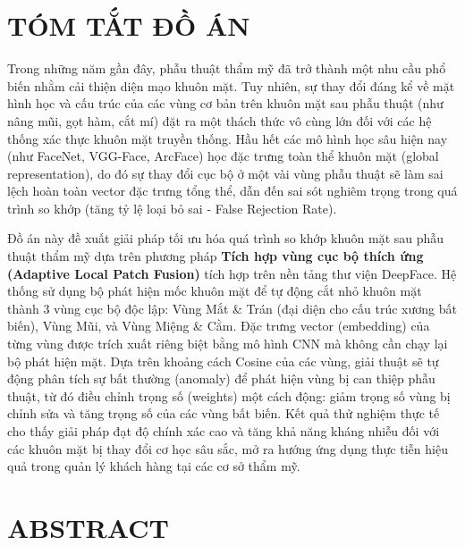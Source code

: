 \section*{TÓM TẮT ĐỒ ÁN}

Trong những năm gần đây, phẫu thuật thẩm mỹ đã trở thành một nhu cầu phổ biến nhằm cải thiện diện mạo khuôn mặt. Tuy nhiên, sự thay đổi đáng kể về mặt hình học và cấu trúc của các vùng cơ bản trên khuôn mặt sau phẫu thuật (như nâng mũi, gọt hàm, cắt mí) đặt ra một thách thức vô cùng lớn đối với các hệ thống xác thực khuôn mặt truyền thống. Hầu hết các mô hình học sâu hiện nay (như FaceNet, VGG-Face, ArcFace) học đặc trưng toàn thể khuôn mặt (global representation), do đó sự thay đổi cục bộ ở một vài vùng phẫu thuật sẽ làm sai lệch hoàn toàn vector đặc trưng tổng thể, dẫn đến sai sót nghiêm trọng trong quá trình so khớp (tăng tỷ lệ loại bỏ sai - False Rejection Rate).

Đồ án này đề xuất giải pháp tối ưu hóa quá trình so khớp khuôn mặt sau phẫu thuật thẩm mỹ dựa trên phương pháp \textbf{Tích hợp vùng cục bộ thích ứng (Adaptive Local Patch Fusion)} tích hợp trên nền tảng thư viện DeepFace. Hệ thống sử dụng bộ phát hiện mốc khuôn mặt để tự động cắt nhỏ khuôn mặt thành 3 vùng cục bộ độc lập: Vùng Mắt \& Trán (đại diện cho cấu trúc xương bất biến), Vùng Mũi, và Vùng Miệng \& Cằm. Đặc trưng vector (embedding) của từng vùng được trích xuất riêng biệt bằng mô hình CNN mà không cần chạy lại bộ phát hiện mặt. Dựa trên khoảng cách Cosine của các vùng, giải thuật sẽ tự động phân tích sự bất thường (anomaly) để phát hiện vùng bị can thiệp phẫu thuật, từ đó điều chỉnh trọng số (weights) một cách động: giảm trọng số vùng bị chỉnh sửa và tăng trọng số của các vùng bất biến. Kết quả thử nghiệm thực tế cho thấy giải pháp đạt độ chính xác cao và tăng khả năng kháng nhiễu đối với các khuôn mặt bị thay đổi cơ học sâu sắc, mở ra hướng ứng dụng thực tiễn hiệu quả trong quản lý khách hàng tại các cơ sở thẩm mỹ.

\newpage
\section*{ABSTRACT}

